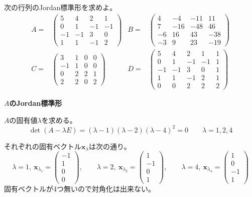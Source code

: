 \documentclass[12pt,b5paper]{ltjsarticle}
\begin{document}
次の行列のJordan標準形を求めよ。
\begin{align}
 A=&
  \begin{pmatrix}
   5 & 4 & 2 & 1\\
   0 & 1 & -1 & -1\\
   -1 & -1 & 3 & 0\\
   1 & 1 & -1 & 2
  \end{pmatrix}
  &
 B=&
  \begin{pmatrix}
   4 & -4 & -11 & 11\\
   7 & -16 & -48 & 46\\
   -6 & 16 & 43 & -38\\
   -3 & 9 & 23 & -19
  \end{pmatrix}
 \\
 C=&
  \begin{pmatrix}
   3 & 1 & 0 & 0\\
   -1 & 1 & 0 & 0\\
   0 & 2 & 2 & 1\\
   2 & 2 & 0 & 2
  \end{pmatrix}
  &
 D=&
  \begin{pmatrix}
   5 & 4 & 2 & 1 & 1\\
   0 & 1 & -1 & -1 & 1\\
   -1 & -1 & 3 & 0 & 1\\
   1 & 1 & -1 & 2 & 1\\
   0 & 0 & 2 & 2 & 2
  \end{pmatrix}
\end{align}

\dotfill
\textbf{$A$のJordan標準形}
\dotfill

$A$の固有値$\lambda$を求める。
\begin{equation}
 \det(A-\lambda E)=(\lambda-1)(\lambda-2)(\lambda-4)^2=0
  \qquad \lambda=1,2,4
\end{equation}

それぞれの固有ベクトル$\bm{x}_{\lambda}$は次の通り。
\begin{equation}
 \lambda =1 ,\ \bm{x}_{\lambda_1}=\begin{pmatrix}-1\\1\\0\\0\end{pmatrix},
 \qquad
 \lambda =2 ,\ \bm{x}_{\lambda_2}=\begin{pmatrix}1\\-1\\0\\1\end{pmatrix},
 \qquad
 \lambda =4 ,\ \bm{x}_{\lambda_4}=\begin{pmatrix}1\\0\\-1\\1\end{pmatrix}
\end{equation}
固有ベクトルが4つ無いので対角化は出来ない。
\end{document}
